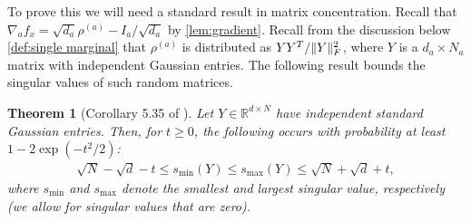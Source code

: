 \documentclass[aos]{imsart}
\newtheorem{theorem}{Theorem}[section]
\theoremstyle{definition}
\numberwithin{equation}{section}
\DeclarePairedDelimiter{\norm}{\lVert}{\rVert}
\newcommand{\R}{{\mathbb{R}}}
\newcommand{\samp}{x}
\begin{document}
To prove this we will need a standard result in matrix concentration.
Recall that $\nabla_a f_{\samp} = \sqrt{d_a} \rho^{(a)} - I_a/\sqrt{d_a}$ by \cref{lem:gradient}.
Recall from the discussion below \cref{def:single marginal} that $\rho^{(a)}$ is distributed as $Y Y^T / \norm{Y}_F^2$, where $Y$ is a $d_a \times N_a$ matrix with independent Gaussian entries.
The following result bounds the singular values of such random matrices.

\begin{theorem}[Corollary 5.35 of \cite{vershynin2010introduction}]\label{cor:vershynin}
Let $Y \in \R^{d \times N}$ have independent standard Gaussian entries.
Then, for $t \geq 0$, the following occurs with probability at least $1 - 2 \exp(-t^{2}/2)$:
\begin{align*}
  \sqrt{N} - \sqrt{d} - t \leq s_{\min}(Y) \leq s_{\max}(Y) \leq \sqrt{N} + \sqrt{d} + t,
\end{align*}
where $s_{\min}$ and $s_{\max}$ denote the smallest and largest singular value, respectively (we allow for singular values that are zero).
\end{theorem}
\end{document}
